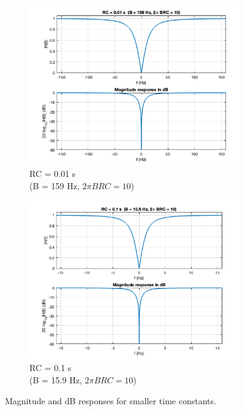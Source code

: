 \documentclass[11pt]{article}
\begin{document}
\begin{figure}[H]
    \centering
    \begin{subfigure}{0.48\textwidth}
        \centering
        \includegraphics[width=\textwidth]{RC_image1.png}
        \caption{RC = 0.01 s \\ (B = 159 Hz, \(2\pi BRC = 10\))}
    \end{subfigure}
    \hfill
    \begin{subfigure}{0.48\textwidth}
        \centering
        \includegraphics[width=\textwidth]{RC_image2.png}
        \caption{RC = 0.1 s \\ (B = 15.9 Hz, \(2\pi BRC = 10\))}
    \end{subfigure}
    \caption{Magnitude and dB responses for smaller time constants.}
\end{figure}
\end{document}
